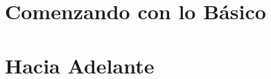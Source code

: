 \documentclass[10pt]{book}
\begin{document}
% 


\mainmatter

\part{Comenzando con lo Básico}


























\part{Hacia Adelante}











\appendix



\printindex

\end{document}
